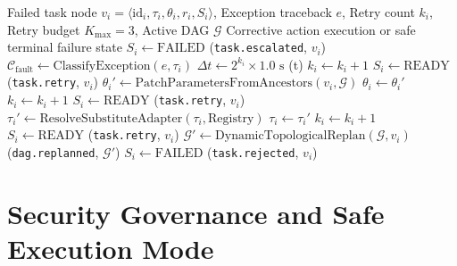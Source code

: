 \documentclass[conference]{IEEEtran}
\begin{document}
\begin{algorithm}[htbp]
\caption{Bounded Self-Healing Recovery Engine}
\label{alg:healing_recovery}
\begin{algorithmic}[1]
\REQUIRE Failed task node $v_i = \langle \text{id}_i, \tau_i, \theta_i, r_i, S_i \rangle$, Exception traceback $e$, Retry count $k_i$, Retry budget $K_{\text{max}}=3$, Active DAG $\mathcal{G}$
\ENSURE Corrective action execution or safe terminal failure state
    \STATE $S_i \leftarrow \text{FAILED}$
    \STATE {}(\texttt{task.escalated}, $v_i$)
    \RETURN \FALSE
\ENDIF
\STATE $\mathcal{C}_{\text{fault}} \leftarrow \text{ClassifyException}(e, \tau_i)$
        \STATE $\Delta t \leftarrow 2^{k_i} \times 1.0\text{ s}$
        \STATE {}(\Delta t)
        \STATE $k_i \leftarrow k_i + 1$
        \STATE $S_i \leftarrow \text{READY}$
        \STATE {}(\texttt{task.retry}, $v_i$)
    \ENDCASE
        \STATE $\theta_i' \leftarrow \text{PatchParametersFromAncestors}(v_i, \mathcal{G})$
        \STATE $\theta_i \leftarrow \theta_i'$
        \STATE $k_i \leftarrow k_i + 1$
        \STATE $S_i \leftarrow \text{READY}$
        \STATE {}(\texttt{task.retry}, $v_i$)
    \ENDCASE
        \STATE $\tau_i' \leftarrow \text{ResolveSubstituteAdapter}(\tau_i, \text{Registry})$
            \STATE $\tau_i \leftarrow \tau_i'$
            \STATE $k_i \leftarrow k_i + 1$
            \STATE $S_i \leftarrow \text{READY}$
            \STATE {}(\texttt{task.retry}, $v_i$)
        \ELSE
            \STATE $\mathcal{G}' \leftarrow \text{DynamicTopologicalReplan}(\mathcal{G}, v_i)$
            \STATE {}(\texttt{dag.replanned}, $\mathcal{G}'$)
        \ENDIF
    \ENDCASE
        \STATE $S_i \leftarrow \text{FAILED}$
        \STATE {}(\texttt{task.rejected}, $v_i$)
        \RETURN \FALSE
    \ENDCASE
\ENDSWITCH
\RETURN \TRUE
\end{algorithmic}
\end{algorithm}

\section{Security Governance and Safe Execution Mode}
\label{sec:security}
\end{document}
